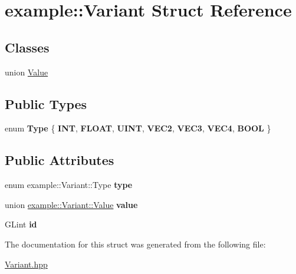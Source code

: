 \hypertarget{structexample_1_1_variant}{}\section{example\+::Variant Struct Reference}
\label{structexample_1_1_variant}
\subsection*{Classes}
\begin{DoxyCompactItemize}
\item 
union \mbox{\hyperlink{unionexample_1_1_variant_1_1_value}{Value}}
\end{DoxyCompactItemize}
\subsection*{Public Types}
\begin{DoxyCompactItemize}
\item 
\mbox{\label{structexample_1_1_variant_abdf52e54d338a0c03a6d0bf2762211d0}} 
enum {\bfseries Type} \{ \newline
{\bfseries I\+NT}, 
{\bfseries F\+L\+O\+AT}, 
{\bfseries U\+I\+NT}, 
{\bfseries V\+E\+C2}, 
\newline
{\bfseries V\+E\+C3}, 
{\bfseries V\+E\+C4}, 
{\bfseries B\+O\+OL}
 \}
\end{DoxyCompactItemize}
\subsection*{Public Attributes}
\begin{DoxyCompactItemize}
\item 
\mbox{\label{structexample_1_1_variant_ac94f6531bde1cca00eee66c1d2cfa6ec}} 
enum example\+::\+Variant\+::\+Type {\bfseries type}
\item 
\mbox{\label{structexample_1_1_variant_a1feed3bca8ed6213c58dc487302b784e}} 
union \mbox{\hyperlink{unionexample_1_1_variant_1_1_value}{example\+::\+Variant\+::\+Value}} {\bfseries value}
\item 
\mbox{\label{structexample_1_1_variant_aca5eb15279ced02e65628e563d505f84}} 
G\+Lint {\bfseries id}
\end{DoxyCompactItemize}


The documentation for this struct was generated from the following file\+:\begin{DoxyCompactItemize}
\item 
\mbox{\hyperlink{_variant_8hpp}{Variant.\+hpp}}\end{DoxyCompactItemize}
